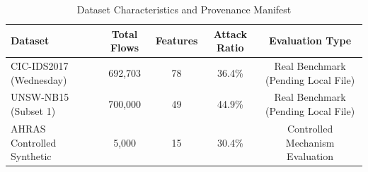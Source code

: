\begin{table}[t]
\centering
\small
\caption{Dataset Characteristics and Provenance Manifest}
\label{tab:dataset_provenance}
\begin{tabular}{lcccc}
\toprule
\textbf{Dataset} & \textbf{Total Flows} & \textbf{Features} & \textbf{Attack Ratio} & \textbf{Evaluation Type} \\
\midrule
CIC-IDS2017 (Wednesday) & 692,703 & 78 & 36.4\% & Real Benchmark (Pending Local File) \\
UNSW-NB15 (Subset 1) & 700,000 & 49 & 44.9\% & Real Benchmark (Pending Local File) \\
AHRAS Controlled Synthetic & 5,000 & 15 & 30.4\% & Controlled Mechanism Evaluation \\
\bottomrule
\end{tabular}
\end{table}